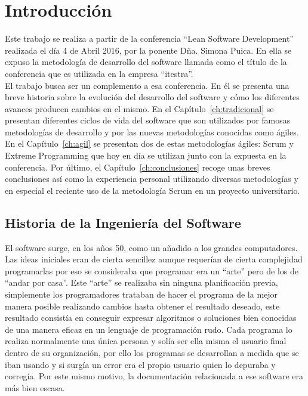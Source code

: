 \chapter{Introducción}
\label{ch:intro}

Este trabajo se realiza a partir de la conferencia ``Lean Software
Development'' realizada el día 4 de Abril 2016, por la ponente
Dña. Simona Puica. En ella se expuso la metodología de desarrollo del
software llamada como el título de la conferencia que es utilizada en
la empresa ``itestra''.\\

El trabajo busca ser un complemento a esa conferencia. En él se
presenta una breve historia sobre la evolución del desarrollo del
software y cómo los diferentes avances producen cambios en el
mismo. En el Capítulo~\ref{ch:tradicional} se presentan diferentes
ciclos de vida del software que son utilizados por famosas
metodologías de desarrollo y por las nuevas metodologías conocidas
como ágiles. En el Capítulo~\ref{ch:agil} se presentan dos de estas
metodologías ágiles: Scrum y Extreme Programming que hoy en día se
utilizan junto con la expuesta en la conferencia. Por último, el
Capítulo~\ref{ch:conclusiones} recoge unas breves conclusiones así
como la experiencia personal utilizando diversas metodologías y en
especial el reciente uso de la metodología Scrum en un proyecto
universitario.

\section{Historia de la Ingeniería del Software}
\label{sec:historia}

El software surge, en los años 50, como un añadido a los grandes
computadores. Las ideas iniciales eran de cierta sencillez aunque
requerían de cierta complejidad programarlas por eso se consideraba
que programar era un ``arte'' pero de los de ``andar por casa''. Este
“arte” se realizaba sin ninguna planificación previa, simplemente los
programadores trataban de hacer el programa de la mejor manera posible
realizando cambios hasta obtener el resultado deseado, este resultado
consistía en conseguir expresar algoritmos o soluciones bien conocidas
de una manera eficaz en un lenguaje de programación rudo. Cada
programa lo realiza normalmente una única persona y solía ser ella
misma el usuario final dentro de su organización, por ello los
programas se desarrollan a medida que se iban usando y si surgía un
error era el propio usuario quien lo depuraba y corregía. Por este
mismo motivo, la documentación relacionada a ese software era más bien
escasa.\\

